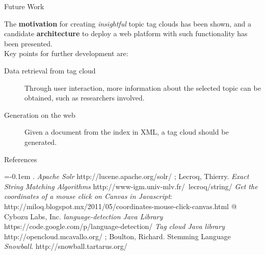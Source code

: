 \documentclass[a0paper, portrait]{baposter}
\begin{document}
\begin{poster}
  
  \begin{posterbox}[column=2, name=future, below=interact] {Future Work} {
    The {\bf motivation} for creating {\em insightful} topic tag clouds has been shown, and a candidate {\bf architecture} to deploy a web platform with such functionality has been presented.  \\[3ex]
    Key points for further development are:
    \begin{description}
      \item[Data retrieval from tag cloud] Through user interaction, more information about the selected topic can be obtained, such as researchers involved.
      \item[Generation on the web] Given a document from the index in XML, a tag cloud should be generated.
    \end{description}
  }
  \end{posterbox}
  
  \begin{posterbox}[column=2, name=ref, below=future] {References} {
      \small {
      \begin{flushleft}
        
        \renewcommand{\section}[2]{\vskip 0.05em}
        \begin{thebibliography}{7}\itemsep=-0.1em 
          \setlength{\baselineskip}{0.4em}
            . {\it Apache Solr} 
            \newblock http://lucene.apache.org/solr/  
            ; {\sc Lecroq, Thierry}. {\it Exact String Matching Algorithms}  
            \newblock http://www-igm.univ-mlv.fr/~lecroq/string/      
             {\it Get the coordinates of a mouse click on Canvas in Javascript}:
            \newblock http://miloq.blogspot.mx/2011/05/coordinates-mouse-click-canvas.html
             @ Cybozu Labs, Inc. {\it language-detection Java Library} 
            \newblock https://code.google.com/p/language-detection/
             {\it Tag cloud Java library} 
            \newblock http://opencloud.mcavallo.org/ 
            ; {\sc Boulton, Richard}. Stemming Language {\em Snowball}. 
            \newblock http://snowball.tartarus.org/
        \end{thebibliography}
        \vspace{0.3em}       
      \end{flushleft}
      }
    }
  \end{posterbox}


\end{poster}
\end{document}
